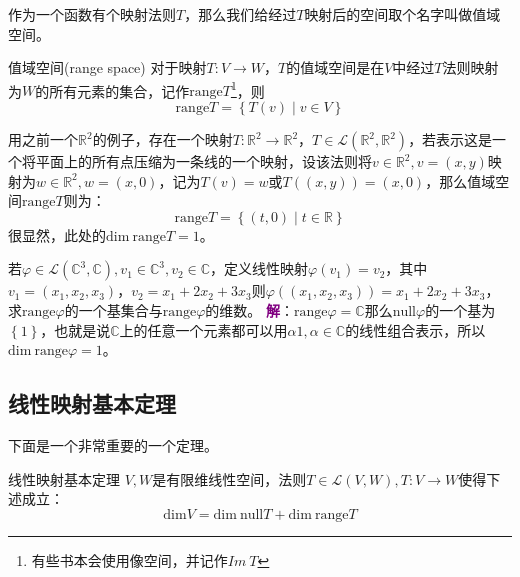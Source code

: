 作为一个函数有个映射法则$T$，那么我们给经过$T$映射后的空间取个名字叫做值域空间。

\begin{definition}{值域空间(range space)}
	对于映射$T:V\rightarrow W$，$T$的值域空间是在$V$中经过$T$法则映射为$W$的所有元素的集合，记作$\text{range}T$\footnote{有些书本会使用像空间，并记作$Im~T$}，则
	$$
	\text{range}T=\left\{ T(v)\mid v\in V \right\}
	$$
\end{definition}

用之前一个$\mathbb{R}^2$的例子，存在一个映射$T: \mathbb{R}^2\rightarrow \mathbb{R}^2$，$T\in \mathcal{L}(\mathbb{R}^2,\mathbb{R}^2)$，若表示这是一个将平面上的所有点压缩为一条线的一个映射，设该法则将$v\in \mathbb{R}^2,v=(x,y)$映射为$w\in \mathbb{R}^2,w=(x,0)$，记为$T(v)=w$或$T((x,y))=(x,0)$，那么值域空间$\text{range}T$则为：
$$
\text{range}T=\left\{ (t,0)\mid t\in \mathbb{R} \right\}
$$
很显然，此处的$\text{dim}~\text{range}T=1$。
\begin{example}
	若$\varphi \in \mathcal{L}(\mathbb{C}^3,\mathbb{C}),v_1\in \mathbb{C}^3,v_2\in \mathbb{C}$，定义线性映射$\varphi(v_1)=v_2$，其中$v_1=(x_1,x_2,x_3)$，$v_2=x_1+2x_2+3x_3$则$\varphi((x_1,x_2,x_3))=x_1+2x_2+3x_3$，求$\text{range}\varphi$的一个基集合与$\text{range}\varphi$的维数。
	\tcblower
	\textcolor{purple}{\textbf{解}}：$\text{range}\varphi=\mathbb{C}$那么$\text{null}\varphi$的一个基为$\left\{ 1 \right\}$，也就是说$\mathbb{C}$上的任意一个元素都可以用$\alpha 1,\alpha\in \mathbb{C}$的线性组合表示，所以$\text{dim}~\text{range}\varphi =1$。
\end{example}

\subsection{线性映射基本定理}

下面是一个非常重要的一个定理。

\begin{theorem}{线性映射基本定理}
	$V,W$是有限维线性空间，法则$T\in\mathcal{L}(V,W),T:V\rightarrow W$使得下述成立：$$\text{dim}V=\text{dim}~\text{null}T+\text{dim}~\text{range}T$$
\end{theorem}

